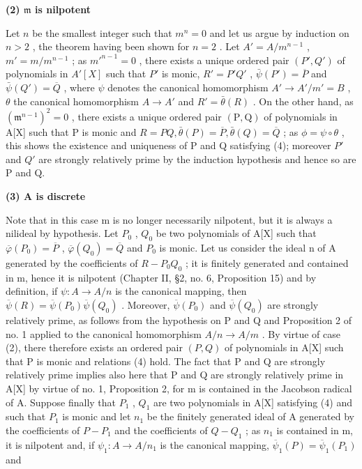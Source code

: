 \textbf{(2) \(\mathfrak{m}\) is nilpotent}\par

Let \(n\) be the smallest integer such that \(m^n = 0\) and let us argue by induction on \(n > 2\) , the theorem having been shown for \(n = 2\) . Let \(A' = A / m^{n-1}\) , \(m' = m / m^{n-1}\) ; as \(m'^{n-1} = 0\) , there exists a unique ordered pair \((P', Q')\) of polynomials in \(A'[X]\) such that \(P'\) is monic, \(R' = P'Q'\) , \(\bar{\psi}(P') = \overline{P}\) and \(\bar{\psi}(Q') = \overline{Q}\) , where \(\psi\) denotes the canonical homomorphism \(A' \to A'/m' = B\) , \(\theta\) the canonical homomorphism \(A \to A'\) and \(R' = \bar{\theta}(R)\) . On the other hand, as \((\mathfrak{m}^{n-1})^{2}=0\) , there exists a unique ordered pair \((\mathrm{P},\mathrm{Q})\) of polynomials in A{[}X{]} such that P is monic and \(R=PQ,\bar{\theta}(P)=\overline{P},\bar{\theta}(Q)=\overline{Q}\) ; as \(\phi=\psi\circ\theta\) , this shows the existence and uniqueness of P and Q satisfying (4); moreover \(P'\) and \(Q'\) are strongly relatively prime by the induction hypothesis and hence so are P and Q.

\textbf{(3) A is discrete}\par

Note that in this case m is no longer necessarily nilpotent, but it is always a nilideal by hypothesis. Let \(P_{0}\) , \(Q_{0}\) be two polynomials of A{[}X{]} such that \(\overline{\varphi}(P_{0}) = \overline{P}\) , \(\overline{\varphi}(Q_{0}) = \overline{Q}\) and \(P_{0}\) is monic. Let us consider the ideal n of A generated by the coefficients of \(R - P_{0}Q_{0}\) ; it is finitely generated and contained in m, hence it is nilpotent (Chapter II, §2, no. 6, Proposition 15) and by definition, if \(\psi: A \to A/n\) is the canonical mapping, then \(\overline{\psi}(R) = \overline{\psi}(P_{0})\overline{\psi}(Q_{0})\) . Moreover, \(\overline{\psi}(P_{0})\) and \(\overline{\psi}(Q_{0})\) are strongly relatively prime, as follows from the hypothesis on P and Q and Proposition 2 of no. 1 applied to the canonical homomorphism \(A/n \to A/m\) . By virtue of case (2), there therefore exists an ordered pair \((P, Q)\) of polynomials in A{[}X{]} such that P is monic and relations (4) hold. The fact that P and Q are strongly relatively prime implies also here that P and Q are strongly relatively prime in A{[}X{]} by virtue of no. 1, Proposition 2, for m is contained in the Jacobson radical of A. Suppose finally that \(P_{1}\) , \(Q_{1}\) are two polynomials in A{[}X{]} satisfying (4) and such that \(P_{1}\) is monic and let \(n_{1}\) be the finitely generated ideal of A generated by the coefficients of \(P - P_{1}\) and the coefficients of \(Q - Q_{1}\) ; as \(n_{1}\) is contained in m, it is nilpotent and, if \(\psi_{1}: A \to A/n_{1}\) is the canonical mapping, \(\overline{\psi}_{1}(P) = \overline{\psi}_{1}(P_{1})\) and

